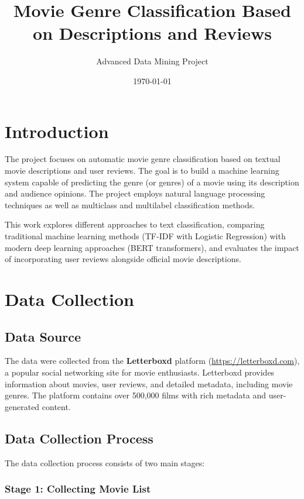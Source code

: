 \documentclass[12pt,a4paper]{article}
\title{Movie Genre Classification Based on Descriptions and Reviews}
\author{Advanced Data Mining Project}
\date{\today}
\begin{document}
\maketitle

\tableofcontents
\newpage

\section{Introduction}

The project focuses on automatic movie genre classification based on textual movie descriptions and user reviews. The goal is to build a machine learning system capable of predicting the genre (or genres) of a movie using its description and audience opinions. The project employs natural language processing techniques as well as multiclass and multilabel classification methods.

This work explores different approaches to text classification, comparing traditional machine learning methods (TF-IDF with Logistic Regression) with modern deep learning approaches (BERT transformers), and evaluates the impact of incorporating user reviews alongside official movie descriptions.

\section{Data Collection}

\subsection{Data Source}

The data were collected from the \textbf{Letterboxd} platform (\url{https://letterboxd.com}), a popular social networking site for movie enthusiasts. Letterboxd provides information about movies, user reviews, and detailed metadata, including movie genres. The platform contains over 500,000 films with rich metadata and user-generated content.

\subsection{Data Collection Process}

The data collection process consists of two main stages:

\subsubsection{Stage 1: Collecting Movie List}
\end{document}
